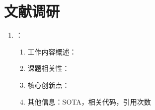 \chapter{文献调研}
\begin{enumerate}
    \item \citet{sorella2001generalized}：
    \begin{enumerate}
        \item 工作内容概述：
        \item 课题相关性：
        \item 核心创新点：
        \item 其他信息：SOTA，相关代码，引用次数
    \end{enumerate}

    
\end{enumerate}